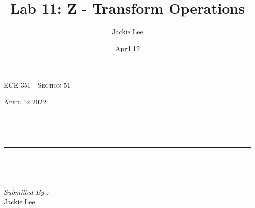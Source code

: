 \documentclass[12pt]{report}
\title{Lab 11: Z - Transform Operations}
\author{ Jackie Lee}
\date{April 12}
\makeatletter
\let\thetitle\@title
\makeatother
\begin{document}

\begin{titlepage}
	\centering
    \vspace*{0.5 cm}
\begin{center}    \textsc{\Large   ECE 351 - Section 51 }\\[2.0 cm]	\end{center}%
	\textsc{\Large April 12 2022  }\\[0.5 cm]				%
	\rule{\linewidth}{0.2 mm} \\[0.4 cm]
	{ \huge \bfseries \thetitle}\\
	\rule{\linewidth}{0.2 mm} \\[1.5 cm]
	
	\begin{minipage}{0.4\textwidth}
		\begin{flushleft} \large
			\end{flushleft}
			\end{minipage}~
			\begin{minipage}{0.4\textwidth}
            
			\begin{flushright} \large
			\emph{Submitted By :} \\
			Jackie Lee  
		\end{flushright}
           
	\end{minipage}\\[2 cm]
	
    
    
    
    
	
\end{titlepage}


\tableofcontents
\pagebreak

\renewcommand{\thesection}{\arabic{section}}
\end{document}
